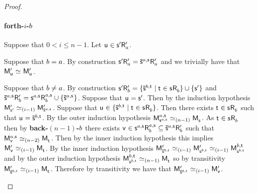 \begin{proof}
\begin{enumerate}
        \paragraph{forth-$i$-$b$} Suppose that $0 < i \leq n - 1$. Let $\aStateU \in \aStateS[\prime] \aAccessibility[\prime]{\agentA}$. 

        Suppose that $b = a$.
        By construction $\aStateS[\prime] \aAccessibility[\prime]{\agentA} = \aPStateS[\agentA,\aStateS] \aAccessibility[\prime]{\agentA}$ and we trivially have that $\aPModel[\prime]{\aStateU} \bisimilar \aPModel[\prime]{\aStateU}$.

        Suppose that $b \neq a$.
        By construction $\aStateS[\prime] \aAccessibility[\prime]{\agentB} = \{\aPStateS[\agentB,\aStateT] \mid \aStateT \in \aStateS \aAccessibility{\agentB}\} \cup \{\aStateS[\prime]\}$ and $\aPStateS[\agentA,\aStateS] \aAccessibility[\prime]{\agentB} = \aStateS[\agentA,\aStateS] \aAccessibility[\agentA,\aStateS]{\agentB} \cup \{\aPStateS[\agentA,\aStateS]\}$. 
        Suppose that $\aStateU = \aStateS[\prime]$. 
        Then by the induction hypothesis $\aPModel[\prime]{\aStateS[\prime]} \bisimilar[(i-1)] \aPModel[\prime]{\aPStateS[\agentA,\aStateS]}$.
        Suppose that $\aStateU \in \{\aPStateS[\agentB,\aStateT] \mid \aStateT \in \aStateS \aAccessibility{\agentB}\}$. 
        Then there exists $\aStateT \in \aStateS \aAccessibility{\agentB}$ such that $\aStateU = \aPStateS[\agentB,\aStateT]$.
        By the outer induction hypothesis $\aPModel[\agentA,\aStateS]{\aStateS[\agentA,\aStateS]} \bisimilar[(n - 1)] \aPModel{\aStateS}$.
        As $\aStateT \in \aStateS \aAccessibility{\agentB}$ then by {\bf back-$(n-1)$-$b$} there exists $\aStateV \in \aStateS[\agentA,\aStateS] \aAccessibility[\agentA,\aStateS]{\agentB} \subseteq \aPStateS[\agentA,\aStateS] \aAccessibility[\prime]{\agentB}$ such that $\aPModel[\agentA,\aStateS]{\aStateV} \bisimilar[(n - 2)] \aPModel{\aStateT}$.
        Then by the inner induction hypothesis this implies $\aPModel[\prime]{\aStateV} \bisimilar[(i - 1)] \aPModel{\aStateT}$.
        By the inner induction hypothesis $\aPModel[\prime]{\aPStateS[\agentB,\aStateT]} \bisimilar[(i - 1)] \aPModel[\prime]{\aStateS[\agentB,\aStateT]} \bisimilar[(i - 1)] \aPModel[\agentB,\aStateT]{\aStateS[\agentB,\aStateT]}$ and by the outer induction hypothesis $\aPModel[\agentB,\aStateT]{\aStateS[\agentB,\aStateT]} \bisimilar[(n - 1)] \aPModel{\aStateT}$ so by transitivity $\aPModel[\prime]{\aPStateS[\agentB,\aStateT]} \bisimilar[(i - 1)] \aPModel{\aStateT}$.
        Therefore by transitivity we have that $\aPModel[\prime]{\aPStateS[\agentB,\aStateT]} \bisimilar[(i - 1)] \aPModel[\prime]{\aStateV}$.


\end{enumerate}
\end{proof}
